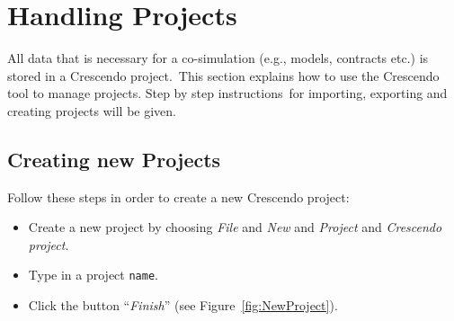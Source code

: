 \documentclass{crescendorepchap}
\begin{document}






\section{Handling Projects}

All data that is necessary for a co-simulation (e.g., models, contracts
etc.) is stored in a Crescendo project.~This section explains how to use
the Crescendo tool to manage projects. Step by step instructions~for
importing, exporting and creating projects will be given.

\subsection{Creating new Projects}

Follow these steps in order to create a new Crescendo project:

\begin{itemize}
\item
  Create a new project by choosing \emph{File} and \emph{New} and
  \emph{Project} and \emph{Crescendo project}.
\item
  Type in a project \texttt{name}.
\item
  Click the button ``\emph{Finish}'' (see Figure~\ref{fig:NewProject}).
\end{itemize}
\end{document}
